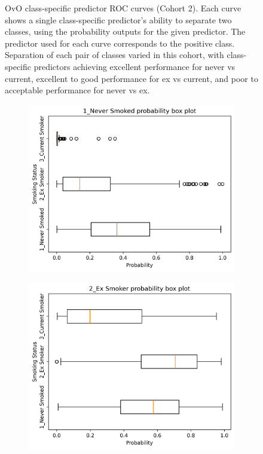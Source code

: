 \documentclass{article} %
\begin{document}
\begin{figure}[p]
\begin{subfigure}{0.46\linewidth}
    \end{subfigure}
    \caption[Class-specific predictor ROC curves (Cohort 2)]{OvO class-specific predictor ROC curves (Cohort 2). Each curve shows a single class-specific predictor's ability to separate two classes, using the probability outputs for the given predictor. The predictor used for each curve corresponds to the positive class. Separation of each pair of classes varied in this cohort, with class-specific predictors achieving excellent performance for never vs current, excellent to good performance for ex vs current, and poor to acceptable performance for never vs ex.}
    \label{fig:cohort2-initial-rocs}
\end{figure}

\begin{figure}[tb]
    \centering
    \begin{subfigure}{0.48\linewidth}
        \centering
        \includegraphics[width=\linewidth]{cohort2/test_boxplot_1.png}
    \end{subfigure}
    \hfill
    \begin{subfigure}{0.48\linewidth}
        \centering
        \includegraphics[width=\linewidth]{cohort2/test_boxplot_2.png}

\end{subfigure}
\end{figure}
\end{document}
